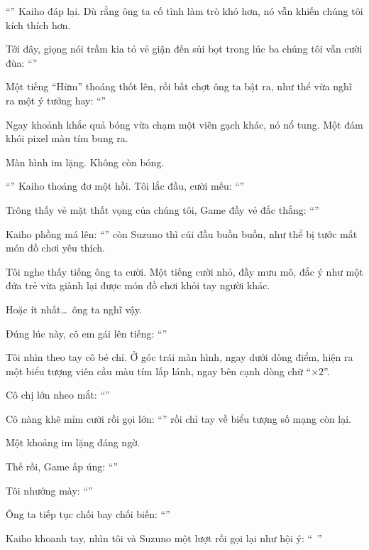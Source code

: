 \documentclass[../main.tex]{subfiles}
\begin{document}
``'' Kaiho đáp lại. Dù rằng ông ta cố tình làm trò khó hơn, nó vẫn khiến chúng tôi kích thích hơn.

Tới đây, giọng nói trầm kia tỏ vẻ giận đến sủi bọt trong lúc ba chúng tôi vẫn cười đùa: ``''

Một tiếng ``Hừm'' thoáng thốt lên, rồi bất chợt ông ta bật ra, như thể vừa nghĩ ra một ý tưởng hay: ``''

Ngay khoảnh khắc quả bóng vừa chạm một viên gạch khác, nó nổ tung. Một đám khói pixel màu tím bung ra.

Màn hình im lặng. Không còn bóng.

``'' Kaiho thoáng đơ một hồi. Tôi lắc đầu, cười mếu: ``''

Trông thấy vẻ mặt thất vọng của chúng tôi, Game đầy vẻ đắc thắng: ``''

Kaiho phồng má lên: ``'' còn Suzuno thì cúi đầu buồn buồn, như thể bị tước mất món đồ chơi yêu thích.

Tôi nghe thấy tiếng ông ta cười. Một tiếng cười nhỏ, đầy mưu mô, đắc ý như một đứa trẻ vừa giành lại được món đồ chơi khỏi tay người khác.

Hoặc ít nhất\dots\ ông ta nghĩ vậy.

Đúng lúc này, cô em gái lên tiếng: ``''

Tôi nhìn theo tay cô bé chỉ. Ở góc trái màn hình, ngay dưới dòng điểm, hiện ra một biểu tượng viên cầu màu tím lấp lánh, ngay bên cạnh dòng chữ ``$\times 2$''.

Cô chị lớn nheo mắt: ``''

Cô nàng khẽ mỉm cười rồi gọi lớn: ``'' rồi chỉ tay về biểu tượng số mạng còn lại.

Một khoảng im lặng đáng ngờ.

Thế rồi, Game ấp úng: ``''

Tôi nhướng mày: ``''

Ông ta tiếp tục chối bay chối biến: ``''

Kaiho khoanh tay, nhìn tôi và Suzuno một lượt rồi gọi lại như hội ý: ``\ ''
\end{document}
